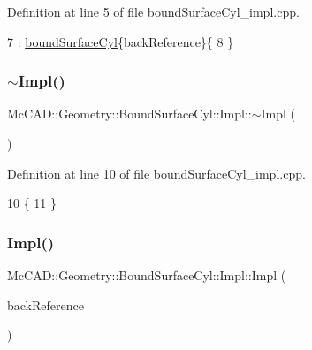 Definition at line 5 of file bound\+Surface\+Cyl\+\_\+impl.\+cpp.


\begin{DoxyCode}
7     : \hyperlink{classMcCAD_1_1Geometry_1_1BoundSurfaceCyl_1_1Impl_a0b0405eb48ad796bd99abe5af5b994ca}{boundSurfaceCyl}\{backReference\}\{
8 \}
\end{DoxyCode}
\mbox{\label{classMcCAD_1_1Geometry_1_1BoundSurfaceCyl_1_1Impl_a90d4f81ce1ab696d7824ccf119a7eb31}} 
\subsubsection{\texorpdfstring{$\sim$\+Impl()}{~Impl()}\hspace{0.1cm}{\footnotesize\ttfamily [1/2]}}
{\footnotesize\ttfamily Mc\+C\+A\+D\+::\+Geometry\+::\+Bound\+Surface\+Cyl\+::\+Impl\+::$\sim$\+Impl (\begin{DoxyParamCaption}{ }\end{DoxyParamCaption})}



Definition at line 10 of file bound\+Surface\+Cyl\+\_\+impl.\+cpp.


\begin{DoxyCode}
10                                        \{
11 \}
\end{DoxyCode}
\mbox{\label{classMcCAD_1_1Geometry_1_1BoundSurfaceCyl_1_1Impl_a7cfaf77f2f5a1abbb226f2ff2ce88602}} 
\subsubsection{\texorpdfstring{Impl()}{Impl()}\hspace{0.1cm}{\footnotesize\ttfamily [2/2]}}
{\footnotesize\ttfamily Mc\+C\+A\+D\+::\+Geometry\+::\+Bound\+Surface\+Cyl\+::\+Impl\+::\+Impl (\begin{DoxyParamCaption}\item[{\hyperlink{classMcCAD_1_1Geometry_1_1BoundSurfaceCyl}{Bound\+Surface\+Cyl} $\ast$}]{back\+Reference }\end{DoxyParamCaption})}

